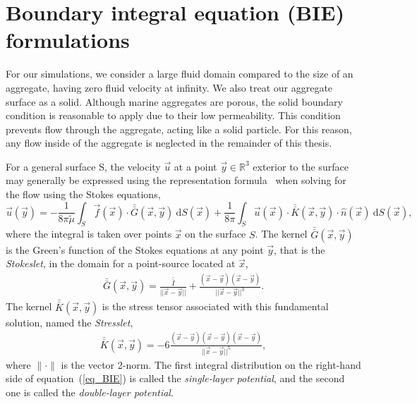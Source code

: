 \section{Boundary integral equation (BIE) formulations} 
For our simulations, we consider a large fluid domain compared to the size of an aggregate, having zero fluid velocity at infinity. We also treat our aggregate surface as a solid. Although marine aggregates are porous, the solid boundary condition is reasonable to apply due to their low permeability. 
This condition prevents flow through the aggregate, acting like a solid particle. For this reason, any flow inside of the aggregate is neglected in the remainder of this thesis.  
\par
For a general surface S, the velocity $\vec{u}$ at a point $\vec{y}\in \mathbb{R}^3$ exterior to the surface may generally be expressed using the representation formula~\cite{pozrikidis_boundary_1992} when solving for the flow using the Stokes equations,
\begin{equation}
   \vec{u}(\vec{y}) =
	- \frac{1}{8 \pi {\tilde{\mu}}} \int_S  \vec{f}(\vec{x}) \cdot \bar{\bar{G}}(\vec{x},\vec{y}) \ \text{d}S(\vec{x}) 
+ \frac{1}{8 \pi} \int_S
\vec{u}(\vec{x}) \cdot  \bar{\bar{K}}(\vec{x},\vec{y})  
\cdot \hat{n} ( \vec{x})
\ \text{d}S(\vec{x}),
\label{eq_BIE}
\end{equation}
where the integral is taken over points $\vec{x}$ on the surface $S$.
The kernel $\bar{\bar{G}}(\vec{x},\vec{y})$ is the Green's function of the Stokes equations at any point $\vec{y}$, that is the {\textit{Stokeslet}}, in the domain for a point-source located at $\vec{x}$,
\begin{align}
  \bar{\bar{G}}(\vec{x},\vec{y}) =   
  \frac{\bar{\bar{I}}}{||\vec{x}-\vec{y}||} + \frac{(\vec{x}-\vec{y})(\vec{x}-\vec{y})}{||\vec{x}-\vec{y}||^3}.
  \label{eq_stokeslet}
  \end{align}
  The kernel  $\bar{\bar{K}}(\vec{x},\vec{y})$ is the stress tensor associated with this fundamental solution, named the {\textit{Stresslet}},
  \begin{align}
  \bar{\bar{K}}(\vec{x},\vec{y}) = 
  -6\frac{(\vec{x}-\vec{y})(\vec{x}-\vec{y}) (\vec{x}-\vec{y})}{||\vec{x}-\vec{y}||^5},
  \label{eq_stresslet}
  \end{align}
where $\| \cdot \|$ is the vector 2-norm. 
The first integral distribution on the right-hand side of equation~(\ref{eq_BIE}) is called the \textit{single-layer potential}, and the second one is called the \textit{double-layer potential}. 
